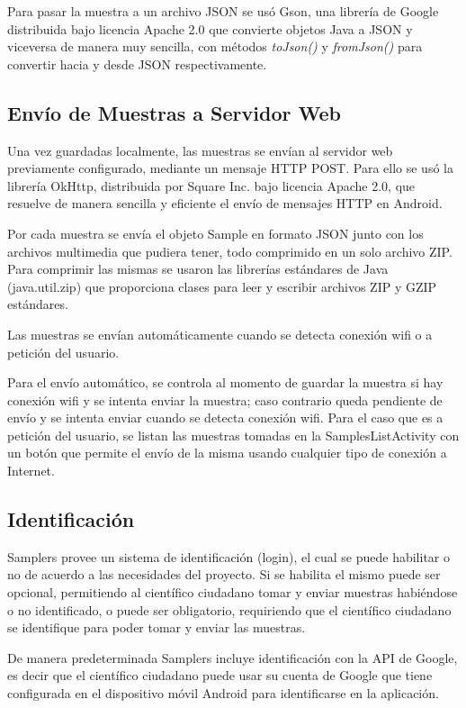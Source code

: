Para pasar la muestra a un archivo JSON se usó Gson\cite{gson}, una librería de Google distribuida bajo licencia Apache 2.0 que convierte objetos Java a JSON y viceversa de manera muy sencilla, con métodos \textit{toJson()} y \textit{fromJson()} para convertir hacia y desde JSON respectivamente.

\subsection{Envío de Muestras a Servidor Web}

Una vez guardadas localmente, las muestras se envían al servidor web previamente configurado, mediante un mensaje HTTP POST. Para ello se usó la librería OkHttp\cite{okhttp}, distribuida por Square Inc. bajo licencia Apache 2.0, que resuelve de manera sencilla y eficiente el envío de mensajes HTTP en Android.

Por cada muestra se envía el objeto Sample en formato JSON junto con los archivos multimedia que pudiera tener, todo comprimido en un solo archivo ZIP. Para comprimir las mismas se usaron las librerías estándares de Java (java.util.zip) que proporciona clases para leer y escribir archivos ZIP y GZIP estándares.

Las muestras se envían automáticamente cuando se detecta conexión wifi o a petición del usuario.

Para el envío automático, se controla al momento de guardar la muestra si hay conexión wifi y se intenta enviar la muestra; caso contrario queda pendiente de envío y se intenta enviar cuando se detecta conexión wifi. Para el caso que es a petición del usuario, se listan las muestras tomadas en la SamplesListActivity con un botón que permite el envío de la misma usando cualquier tipo de conexión a Internet.

\subsection{Identificación}
Samplers provee un sistema de identificación (login), el cual se puede habilitar o no de acuerdo a las necesidades del proyecto. Si se habilita el mismo puede ser opcional, permitiendo al científico ciudadano tomar y enviar muestras habiéndose o no identificado, o puede ser obligatorio, requiriendo que el científico ciudadano se identifique para poder tomar y enviar las muestras.

De manera predeterminada Samplers incluye identificación con la API de Google, es decir que el científico ciudadano puede usar su cuenta de Google que tiene configurada en el dispositivo móvil Android para identificarse en la aplicación.

